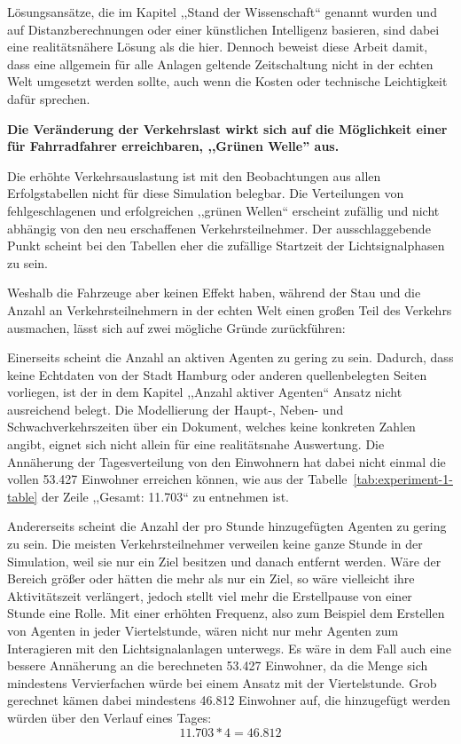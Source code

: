 Lösungsansätze, die im Kapitel ,,Stand der Wissenschaft`` genannt wurden und auf Distanzberechnungen oder einer künstlichen Intelligenz basieren, sind dabei eine realitätsnähere Lösung als die hier.
Dennoch beweist diese Arbeit damit, dass eine allgemein für alle Anlagen geltende Zeitschaltung nicht in der echten Welt umgesetzt werden sollte, auch wenn die Kosten oder technische Leichtigkeit dafür sprechen.

\textbf{Die Veränderung der Verkehrslast wirkt sich auf die Möglichkeit einer für Fahrradfahrer erreichbaren, ,,Grünen Welle'' aus.}

Die erhöhte Verkehrsauslastung ist mit den Beobachtungen aus allen Erfolgstabellen nicht für diese Simulation belegbar.
Die Verteilungen von fehlgeschlagenen und erfolgreichen ,,grünen Wellen`` erscheint zufällig und nicht abhängig von den neu erschaffenen Verkehrsteilnehmer.
Der ausschlaggebende Punkt scheint bei den Tabellen eher die zufällige Startzeit der Lichtsignalphasen zu sein.

Weshalb die Fahrzeuge aber keinen Effekt haben, während der Stau und die Anzahl an Verkehrsteilnehmern in der echten Welt einen großen Teil des Verkehrs ausmachen, lässt sich auf zwei mögliche Gründe zurückführen:

Einerseits scheint die Anzahl an aktiven Agenten zu gering zu sein.
Dadurch, dass keine Echtdaten von der Stadt Hamburg oder anderen quellenbelegten Seiten vorliegen, ist der in dem Kapitel ,,Anzahl aktiver Agenten`` Ansatz nicht ausreichend belegt.
Die Modellierung der Haupt-, Neben- und Schwachverkehrszeiten über ein Dokument, welches keine konkreten Zahlen angibt, eignet sich nicht allein für eine realitätsnahe Auswertung.
Die Annäherung der Tagesverteilung von den Einwohnern hat dabei nicht einmal die vollen 53.427 Einwohner erreichen können, wie aus der Tabelle~\ref{tab:experiment-1-table} der Zeile ,,Gesamt: 11.703`` zu entnehmen ist.

Andererseits scheint die Anzahl der pro Stunde hinzugefügten Agenten zu gering zu sein.
Die meisten Verkehrsteilnehmer verweilen keine ganze Stunde in der Simulation, weil sie nur ein Ziel besitzen und danach entfernt werden.
Wäre der Bereich größer oder hätten die  mehr als nur ein Ziel, so wäre vielleicht ihre Aktivitätszeit verlängert, jedoch stellt viel mehr die Erstellpause von einer Stunde eine Rolle.
Mit einer erhöhten Frequenz, also zum Beispiel dem Erstellen von Agenten in jeder Viertelstunde, wären nicht nur mehr Agenten zum Interagieren mit den Lichtsignalanlagen unterwegs.
Es wäre in dem Fall auch eine bessere Annäherung an die berechneten 53.427 Einwohner, da die Menge sich mindestens Vervierfachen würde bei einem Ansatz mit der Viertelstunde.
Grob gerechnet kämen dabei mindestens 46.812 Einwohner auf, die hinzugefügt werden würden über den Verlauf eines Tages:
\[11.703 * 4 = 46.812\]

